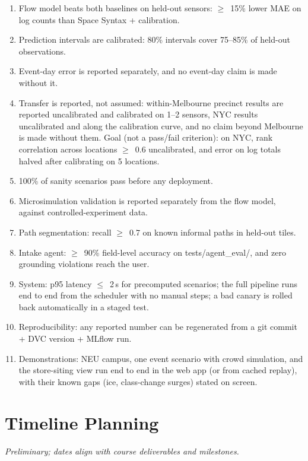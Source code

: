 \documentclass[11pt]{article}
\begin{document}
\begin{enumerate}
  \item Flow model beats both baselines on held-out sensors: $\geq$~15\% lower MAE on log counts than Space Syntax + calibration.
  \item Prediction intervals are calibrated: 80\% intervals cover 75--85\% of held-out observations.
  \item Event-day error is reported separately, and no event-day claim is made without it.
  \item Transfer is reported, not assumed: within-Melbourne precinct results are reported uncalibrated and calibrated on 1--2 sensors, NYC results uncalibrated and along the calibration curve, and no claim beyond Melbourne is made without them. Goal (not a pass/fail criterion): on NYC, rank correlation across locations $\geq$~0.6 uncalibrated, and error on log totals halved after calibrating on 5 locations.
  \item 100\% of sanity scenarios pass before any deployment.
  \item Microsimulation validation is reported separately from the flow model, against controlled-experiment data.
  \item Path segmentation: recall $\geq$~0.7 on known informal paths in held-out tiles.
  \item Intake agent: $\geq$~90\% field-level accuracy on tests/agent\_eval/, and zero grounding violations reach the user.
  \item System: p95 latency $\leq$~2\,s for precomputed scenarios; the full pipeline runs end to end from the scheduler with no manual steps; a bad canary is rolled back automatically in a staged test.
  \item Reproducibility: any reported number can be regenerated from a git commit + DVC version + MLflow run.
  \item Demonstrations: NEU campus, one event scenario with crowd simulation, and the store-siting view run end to end in the web app (or from cached replay), with their known gaps (ice, class-change surges) stated on screen.
\end{enumerate}

\section{Timeline Planning}

\textit{Preliminary; dates align with course deliverables and milestones.}
\end{document}
